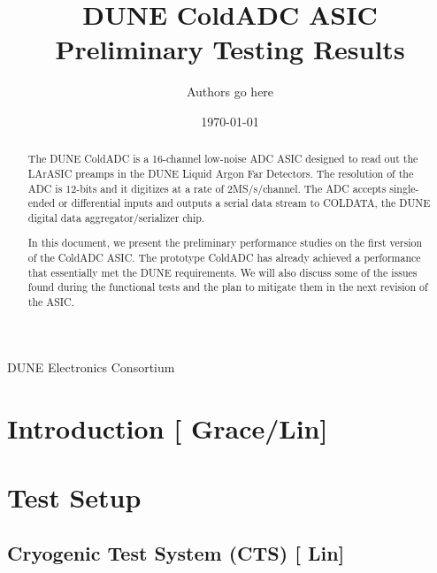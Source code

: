 \documentclass[10pt]{article}
\begin{document}

\title{DUNE ColdADC ASIC Preliminary Testing Results}

\date{\today}
\author{Authors go here}
%	
%	

\maketitle

\centerline{DUNE Electronics Consortium}



\begin{abstract}
The DUNE ColdADC is a 16-channel low-noise ADC ASIC designed to read out the LArASIC preamps in the DUNE Liquid Argon Far Detectors. The resolution of the ADC is 12-bits and it digitizes at a rate of 2MS/s/channel. The ADC accepts single-ended or differential inputs and outputs a serial data stream to COLDATA, the DUNE digital data aggregator/serializer chip.

In this document, we present the preliminary performance studies on the first version of the ColdADC ASIC. The prototype ColdADC has already achieved a performance that essentially met the DUNE requirements. We will also discuss some of the issues found during the functional tests and the plan to mitigate them in the next revision of the ASIC.
\end{abstract}


\newpage
\tableofcontents

\newpage

\section{Introduction [{\color{red} Grace/Lin}] }




\section{Test Setup}

\subsection{Cryogenic Test System (CTS) [{\color{red} Lin}] }

\end{document}

